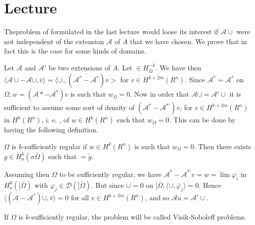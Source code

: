 
\chapter{Lecture}\label{lec19}%
\setcounter{section}{10}

The\pageoriginale problem of formulated in the last lecture would loose its interest
if $\mathscr{A}\cup $ were not independent of the extension
$\mathscr{A}$ of $A$ that we have chosen. We prove that in fact this
is the case for some kinds of domains.  

Let $\mathscr{A}$ and $\mathscr{A'}$ be two extensions of $A$. Let
$\in H^{-k}_{\bar{\Omega}}$. We have then $\langle \mathscr{A} \cup
- \mathscr{A} \cup , \bar{v}\rangle = \langle \cup. , (\overline{\mathscr{A}^* -
  \mathscr{A}^*})v >$ for $v \in H^{k+2m} (R^n)$. Since
$\mathscr{A}^* = \mathscr{A}^*$ on $\Omega , w = (\mathscr{A}* -
\mathscr{A}^*) v$ is such that $w_\Omega = 0$. Now in order that
$\mathscr{A} \cup = \mathscr{A}' \cup$ it is sufficient to assume some
sort of density of $(\mathscr{A}^* - \mathscr{A}^{*'})v$, for $v
\in H^{k+2m} (R^n)$ in $H^k (R^n)$, i. e. , of $w \in
H^k (R^n)$ such that $w_{\Omega} = 0$. This can be done by having the
following definition.  

\begin{definition}\label{lec19:sec10:subsec2:def10.3}%
  $\Omega$ is $k$-sufficiently regular if $w \in H^k (R^n)$ is
  such that $w_\Omega = 0$. Then there exists $g \in H^k_o
  (\sigma \bar{\Omega})$ such that $= \tilde{g}$.  
\end{definition}

Assuming then $\Omega$ to be sufficiently regular, we have
$\mathscr{A}^* - \mathscr{A}^{*'} v = w = \lim \varphi_i$ in $H^k_o
([ \bar{\Omega})$ with $\varphi_j \in \mathscr{D} ([
\bar{\Omega})$. But since $\cup = 0$ on $[ \bar{\Omega}, \langle \cup ,
  \bar{\varphi}_j \rangle = 0$. Hence $\langle  ( \mathscr{A} -
  \mathscr{A}^*) \cup,
  \bar{v}\rangle = 0$ for all $v \in H^{k+2m} (R^n)$, and so
  $\mathscr{A} u = \mathscr{A}' \cup$.  

\begin{definition}\label{lec19:sec10:subsec2:def10.4}%
  If $\Omega$ is $k$-sufficiently regular, the problem will be called
  Visik-Soboleff problems.  
\end{definition}

\subsection{}\label{lec19:sec10:subsec3}

